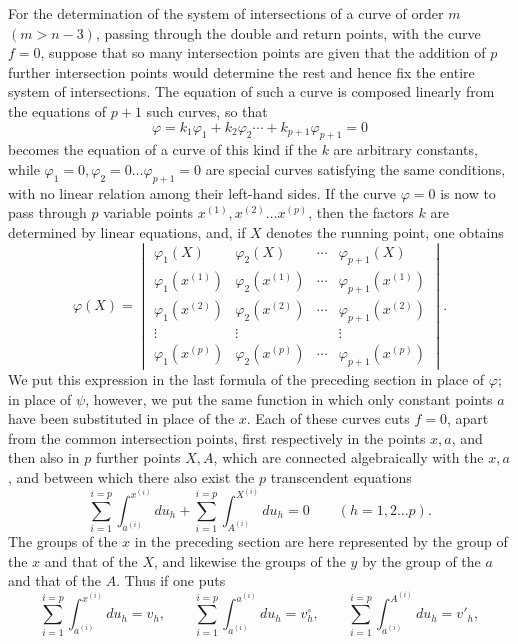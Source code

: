 \documentclass[10pt]{article}
\begin{document}
For the determination of the system of intersections of a curve of order \(m\) \((m>n-3)\), passing through the double and return points, with the curve \(f=0\), suppose that so many intersection points are given that the addition of \(p\) further intersection points would determine the rest and hence fix the entire system of intersections. The equation of such a curve is composed linearly from the equations of \(p+1\) such curves, so that
\[
\varphi=k_1\varphi_1+k_2\varphi_2\cdots+k_{p+1}\varphi_{p+1}=0
\]
becomes the equation of a curve of this kind if the \(k\) are arbitrary constants, while \(\varphi_1=0,\varphi_2=0\ldots\varphi_{p+1}=0\) are special curves satisfying the same conditions, with no linear relation among their left-hand sides. If the curve \(\varphi=0\) is now to pass through \(p\) variable points \(x^{(1)},x^{(2)}\ldots x^{(p)}\), then the factors \(k\) are determined by linear equations, and, if \(X\) denotes the running point, one obtains
\[
\tag{1}
\varphi(X)=
\begin{vmatrix}
\varphi_1(X) & \varphi_2(X) & \cdots & \varphi_{p+1}(X)\\
\varphi_1(x^{(1)}) & \varphi_2(x^{(1)}) & \cdots & \varphi_{p+1}(x^{(1)})\\
\varphi_1(x^{(2)}) & \varphi_2(x^{(2)}) & \cdots & \varphi_{p+1}(x^{(2)})\\
\vdots & \vdots & & \vdots\\
\varphi_1(x^{(p)}) & \varphi_2(x^{(p)}) & \cdots & \varphi_{p+1}(x^{(p)})
\end{vmatrix}.
\]
We put this expression in the last formula of the preceding section in place of \(\varphi\); in place of \(\psi\), however, we put the same function in which only constant points \(a\) have been substituted in place of the \(x\). Each of these curves cuts \(f=0\), apart from the common intersection points, first respectively in the points \(x,a\), and then also in \(p\) further points \(X,A\), which are connected algebraically with the \(x,a\), and between which there also exist the \(p\) transcendent equations
\[
\tag{2}
\sum_{i=1}^{i=p}\int_{a^{(i)}}^{x^{(i)}}du_h+
\sum_{i=1}^{i=p}\int_{A^{(i)}}^{X^{(i)}}du_h=0
\qquad(h=1,2\ldots p).
\]
The groups of the \(x\) in the preceding section are here represented by the group of the \(x\) and that of the \(X\), and likewise the groups of the \(y\) by the group of the \(a\) and that of the \(A\). Thus if one puts
\[
\sum_{i=1}^{i=p}\int_{a^{(i)}}^{x^{(i)}}du_h=v_h,\qquad
\sum_{i=1}^{i=p}\int_{a^{(i)}}^{a^{(i)}}du_h=v_h^\circ,\qquad
\sum_{i=1}^{i=p}\int_{a^{(i)}}^{A^{(i)}}du_h=v'_h,
\]
\end{document}
